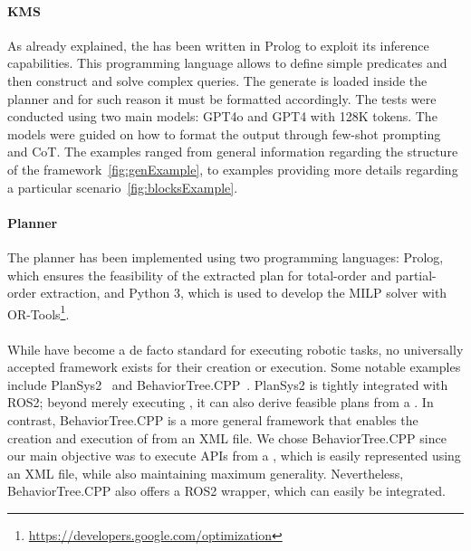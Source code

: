 \paragraph{KMS}
As already explained, the \kb has been written in Prolog to exploit
its inference capabilities. This programming language allows to define
simple predicates and then construct and solve complex queries. The
generate \kbase is loaded inside the planner and for such reason it
must be formatted accordingly.  The tests were conducted using two
main models: GPT4o and GPT4 with 128K tokens. The models were guided
on how to format the output through few-shot prompting and CoT. The
examples ranged from general information regarding the structure of
the framework~\ref{fig:genExample}, to examples providing more details
regarding a particular scenario~\ref{fig:blocksExample}.

\paragraph{Planner}
The planner has been implemented using two programming languages:
Prolog, which ensures the feasibility of the extracted plan for
total-order and partial-order extraction, and Python 3, which is used
to develop the MILP solver with
OR-Tools\footnote{\url{https://developers.google.com/optimization}}.



\paragraph{\Btrees}
While \bts have become a de facto standard for executing robotic
tasks, no universally accepted framework exists for their creation or
execution. Some notable examples include
PlanSys2~\cite{martin2021plansys2} and
BehaviorTree.CPP~\cite{BehaviorTreeCppWebsite}. PlanSys2 is tightly
integrated with ROS2; beyond merely executing \btrees, it can also
derive feasible plans from a \kbase. In contrast,
BehaviorTree.CPP is a more general framework that enables the creation
and execution of \bts from an XML file. We chose BehaviorTree.CPP
since our main objective was to execute APIs from a \bt, which is
easily represented using an XML file, while also maintaining maximum
generality. Nevertheless, BehaviorTree.CPP also offers a ROS2 wrapper,
which can easily be integrated.

